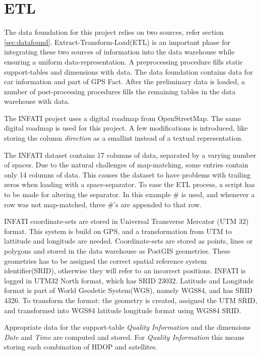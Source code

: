 \section{ETL}\label{sec:ETL}
The data foundation for this project relies on two sources, refer section \ref{sec:datafound}. Extract-Transform-Load(ETL) is an important phase for integrating these two sources of information into the data warehouse while ensuring a uniform data-representation. A preprocessing procedure fills static support-tables and dimensions with data. The data foundation contains data for car information and part of GPS Fact. After the preliminary data is loaded, a number of post-processing procedures fills the remaining tables in the data warehouse with data.

The INFATI project\cite{art:INFATI} uses a digital roadmap from OpenStreetMap\cite{osm}. The same digital roadmap is used for this project. A few modifications is introduced, like storing the column \textit{direction} as a smallint instead of a textual representation. 

The INFATI dataset\cite{art:INFATI} contains 17 columns of data, separated by a varying number of spaces. Due to the natural challenges of map-matching, some entries contain only 14 columns of data. This causes the dataset to have problems with trailing zeros when loading with a space-separator. To ease the ETL process, a script has to be made for altering the separator. In this example \# is used, and whenever a row was not map-matched, three \#'s are appended to that row.

INFATI coordinate-sets are stored in Universal Transverse Mercator (UTM 32) format. This system is build on GPS, and a transformation from UTM to lattitude and longitude are needed. Coordinate-sets are stored as points, lines or polygons and stored in the data warehouse as PostGIS\cite{postgis} geometries. These geometries has to be assigned the correct spatial reference system identifier(SRID), otherwise they will refer to an incorrect positions. INFATI is logged in UTM32 North format, which has SRID 23032\cite{UTM32N}. Latitude and Longitude format is part of World Geodetic System(WGS), namely WGS84, and has SRID 4326\cite{WGS84}. To transform the format: the geometry is created, assigned the UTM SRID, and transformed into WGS84 latitude longitude format using WGS84 SRID. 

Appropriate data for the support-table \textit{Quality Information} and the dimensions \textit{Date} and \textit{Time} are computed and stored. For \textit{Quality Information} this means storing each combination of HDOP and satellites.

